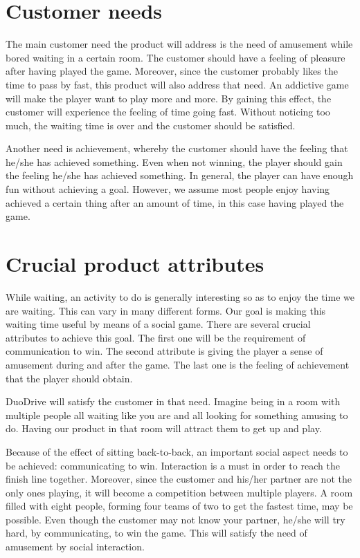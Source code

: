 \documentclass[11pt,twoside,a4paper]{article}
\begin{document}
\section{Customer needs}
The main customer need the product will address is the need of amusement while bored waiting in a certain room. The customer should have a feeling of pleasure after having played the game. Moreover, since the customer probably likes the time to pass by fast, this product will also address that need. An addictive game will make the player want to play more and more. By gaining this effect, the customer will experience the feeling of time going fast. Without noticing too much, the waiting time is over and the customer should be satisfied.

Another need is achievement, whereby the customer should have the feeling that he/she has achieved something. Even when not winning, the player should gain the feeling he/she has achieved something. In general, the player can have enough fun without achieving a goal. However, we assume most people enjoy having achieved a certain thing after an amount of time, in this case having played the game.


\section{Crucial product attributes}
While waiting, an activity to do is generally interesting so as to enjoy the time we are waiting. This can vary in many different forms. Our goal is making this waiting time useful by means of a social game. There are several crucial attributes to achieve this goal. The first one will be the requirement of communication to win. The second attribute is giving the player a sense of amusement during and after the game. The last one is the feeling of achievement that the player should obtain.

DuoDrive will satisfy the customer in that need. Imagine being in a room with multiple people all waiting like you are and all looking for something amusing to do. Having our product in that room will attract them to get up and play.

Because of the effect of sitting back-to-back, an important social aspect needs to be achieved: communicating to win. Interaction is a must in order to reach the finish line together. Moreover, since the customer and his/her partner are not the only ones playing, it will become a competition between multiple players. A room filled with eight people, forming four teams of two to get the fastest time, may be possible. Even though the customer may not know your partner, he/she will try hard, by communicating, to win the game. This will satisfy the need of amusement by social interaction.
\end{document}
